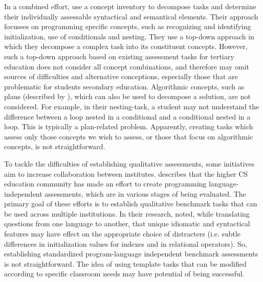 In a combined effort,  use a concept inventory to decompose tasks and determine their individually assessable syntactical and semantical elements. Their approach focusses on programming specific concepts, such as recognizing and identifying initialization, use of conditionals and nesting. They use a top-down approach in which they decompose a complex task into its constituent concepts.  However, such a top-down approach based on existing assessment tasks for tertiary education does not consider all concept combinations, and therefore may omit sources of difficulties and alternative conceptions, especially those that are problematic for students secondary education. Algorithmic concepts, such as plans (described by ), which can also be used to decompose a solution, are not considered. For example, in their nesting-task, a student may not understand the difference between a loop nested in a conditional and a conditional nested in a loop. This is typically a plan-related problem. Apparently, creating tasks which assess only those concepts we wish to assess, or those that focus on algorithmic concepts, is not straightforward.

To tackle the difficulties of establishing qualitative assessments, some initiatives aim to increase collaboration between institutes.  describes that the higher CS education community has made an effort to create programming language-independent assessments, which are in various stages of being evaluated. The primary goal of these efforts is to establish qualitative benchmark tasks that can be used across multiple institutions. In their research,  noted, while translating questions from one language to another, that unique idiomatic and syntactical features may have effect on the appropriate choice of distracters (i.e. subtle differences in initialization values for indexes and in relational operators). So, establishing standardized program-language independent benchmark assessments is not straightforward. The idea of using template tasks that can be modified according to specific classroom needs may have potential of being successful.


